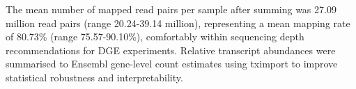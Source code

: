 %
%
The mean number of mapped read pairs per sample after summing was 27.09 million read pairs (range 20.24-39.14 million), representing a mean mapping rate of 80.73\% (range 75.57-90.10\%), comfortably within sequencing depth recommendations for \gls{DGE} experiments\autocite{liu2014RNAseqDifferentialExpression}.
Relative transcript abundances were summarised to Ensembl gene-level count estimates using tximport to improve statistical robustness and interpretability\autocite{soneson2016DifferentialAnalysesRNAseq}.

